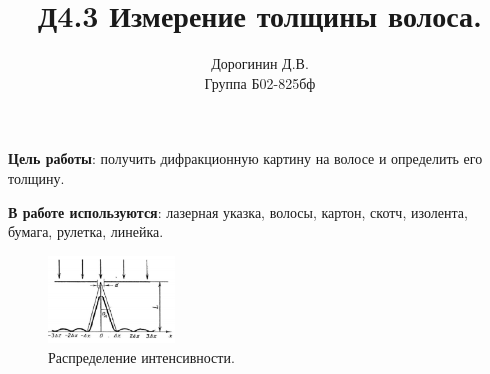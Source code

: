 \documentclass[a4paper,12pt]{article}
\author{Дорогинин Д.В.\\
Группа Б02-825бф}
\title{Д4.3 Измерение толщины волоса.}
\date{}
\begin{document}
\maketitle
\textbf{Цель работы}: получить дифракционную картину на волосе и определить его толщину.


\textbf{В работе используются}: лазерная указка, волосы, картон, скотч, изолента, бумага, рулетка, линейка.

\begin{figure}
\begin{center}
\includegraphics[width = 0.3\textwidth]{1.png}
\end{center}
\caption{Распределение интенсивности.}
\end{figure}
\end{document}
